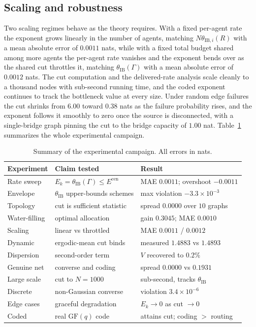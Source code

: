 \documentclass[journal]{IEEEtran}
\theoremstyle{definition}
\theoremstyle{remark}
\newcommand{\Ecen}{E^{\mathrm{cen}}}
\newcommand{\tib}{\theta_{\mathrm{IB}}}
\newcommand{\tibi}{\theta_{\mathrm{IB},i}}
\begin{document}
\subsection{Scaling and robustness}
Two scaling regimes behave as the theory requires. With a fixed per-agent rate the exponent grows linearly in the
number of agents, matching $N\tibi(R)$ with a mean absolute error of $0.0011$ nats, while with a fixed total
budget shared among more agents the per-agent rate vanishes and the exponent bends over as the shared cut throttles
it, matching $\tib(\Gamma)$ with a mean absolute error of $0.0012$ nats. The cut computation and the delivered-rate
analysis scale cleanly to a thousand nodes with sub-second running time, and the coded exponent continues to track
the bottleneck value at every size. Under random edge failures the cut shrinks from $6.00$ toward $0.38$ nats as
the failure probability rises, and the exponent follows it smoothly to zero once the source is disconnected, with
a single-bridge graph pinning the cut to the bridge capacity of $1.00$ nat. Table~\ref{tab:results} summarizes the
whole experimental campaign.

\begin{table}[t]
\centering
\caption{Summary of the experimental campaign. All errors in nats.}
\label{tab:results}
\renewcommand{\arraystretch}{1.2}
\small
\begin{tabular}{@{}lll@{}}
\toprule
Experiment & Claim tested & Result \\
\midrule
Rate sweep & $E_k=\tib(\Gamma)\le\Ecen$ & MAE $0.0011$; overshoot $-0.0011$ \\
Envelope & $\tib$ upper-bounds schemes & max violation $-3.3\times10^{-3}$ \\
Topology & cut is sufficient statistic & spread $0.0000$ over $10$ graphs \\
Water-filling & optimal allocation & gain $0.3045$; MAE $0.0010$ \\
Scaling & linear vs throttled & MAE $0.0011$ / $0.0012$ \\
Dynamic & ergodic-mean cut binds & measured $1.4883$ vs $1.4893$ \\
Dispersion & second-order term & $V$ recovered to $0.2\%$ \\
Genuine net & converse and coding & spread $0.0000$ vs $0.1931$ \\
Large scale & cut to $N=1000$ & sub-second, tracks $\tib$ \\
Discrete & non-Gaussian converse & violation $3.4\times10^{-6}$ \\
Edge cases & graceful degradation & $E_k\to0$ as cut $\to0$ \\
Coded & real $\mathrm{GF}(q)$ code & attains cut; coding $>$ routing \\
\bottomrule
\end{tabular}
\end{table}
\end{document}

